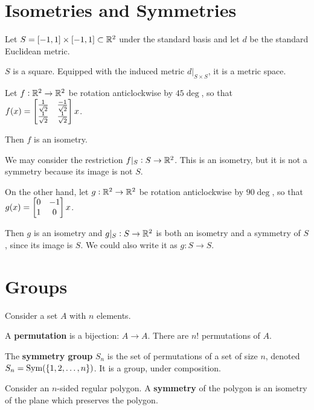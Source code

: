 \section{Isometries and Symmetries}

\begin{example*}
  Let $S = [-1, 1] \times [-1, 1] \subset \mathbb{R}^2$ under the standard basis and let $d$ be the
  standard Euclidean metric.

  $S$ is a square. Equipped with the induced metric $d|_{S\times S}$, it is a metric space.

  Let $f:\mathbb{R}^2 \to \mathbb{R}^2$ be rotation anticlockwise by $45\deg$, so that
  $f(x) = \begin{bmatrix}\frac{1}{\sqrt{2}} & \frac{-1}{\sqrt{2}}\\\frac{1}{\sqrt{2}} & \frac{1}{\sqrt{2}}\\ \end{bmatrix}x$.

  Then $f$ is an isometry.

  We may consider the restriction $f|_S: S \to \mathbb{R}^2$. This is an isometry, but it is not a symmetry
  because its image is not $S$.

  On the other hand, let $g:\mathbb{R}^2 \to \mathbb{R}^2$ be rotation anticlockwise by $90\deg$, so that
  $g(x) = \begin{bmatrix}0 & -1\\1 & 0\\ \end{bmatrix}x$.

  Then $g$ is an isometry and $g|_S: S \to \mathbb{R}^2$ is both an isometry and a symmetry of $S$, since
  its image is $S$. We could also write it as $g: S \to S$.
\end{example*}


\section{Groups}

Consider a set $A$ with $n$ elements.

\begin{definition*}
  A \textbf{permutation} is a bijection: $A \to A$. There are $n!$ permutations of $A$.
\end{definition*}

\begin{definition*}
  The \textbf{symmetry group} $S_n$ is the set of permutations of a set of size $n$, denoted
  $S_n = \text{Sym}(\{1,2,\ldots,n\})$. It is a group, under composition.
\end{definition*}

\begin{definition*}
  Consider an $n$-sided regular polygon. A \textbf{symmetry} of the polygon is an isometry of the
  plane which preserves the polygon.
\end{definition*}

